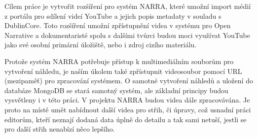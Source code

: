 \par Cílem práce je vytvořit rozšíření pro systém NARRA, které umožní import médií z portálu pro sdílení videí YouTube a jejich popis metadaty v souladu s DublinCore. Toto rozšíření umožní zpřístupnění videa v systému pro Open Narrative a dokumentaristé spolu s dalšími tvůrci budou moci využívat YouTube jako své osobní primární úložiště, nebo i zdroj cizího materiálu.
\par Protože systém NARRA potřebuje přístup k multimediálním souborům pro vytvoření náhledu, je naším úkolem také zpřístupnit videosoubor pomocí URL (mezipaměť) pro zpracování systémem. O samotné vytvoření náhledů a uložení do databáze MongoDB se stará samotný systém, ale základní principy budou vysvětleny i v této práci. V projektu NARRA budou videa dále zpracovávána. Je proto na místě umět nabídnout další videa pro střih, či úpravy, což usnadní práci editorům, kteří neznají dodaná data úplně do detailu a tak sami netuší, jestli se pro další střih nenabízí něco lepšího.